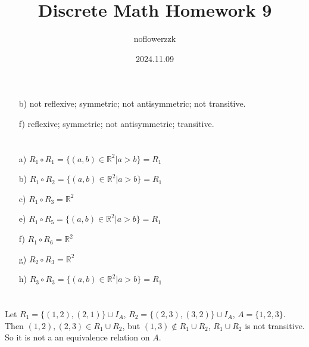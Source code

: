 \documentclass{article}
\title{Discrete Math Homework 9}
\author{noflowerzzk}
\date{2024.11.09}
\begin{document}
\maketitle

\section{}

\begin{itemize}
    \item [b)] not reflexive; symmetric; not antisymmetric; not transitive.
    \item [f)] reflexive; symmetric; not antisymmetric; transitive.
\end{itemize}

\section{}

\begin{itemize}
    \item [a)] $R_1 \circ R_1 = \{(a, b) \in \mathbb{R}^2| a > b\} = R_1$
    \item [b)] $R_1 \circ R_2 = \{(a, b) \in \mathbb{R}^2| a > b\} = R_1$
    \item [c)] $R_1 \circ R_3 = \mathbb{R}^2$
    \item [e)] $R_1 \circ R_5 = \{(a, b) \in \mathbb{R}^2| a > b\} = R_1$
    \item [f)] $R_1 \circ R_6 = \mathbb{R}^2$
    \item [g)] $R_2 \circ R_3 = \mathbb{R}^2$
    \item [h)] $R_3 \circ R_3 = \{(a, b) \in \mathbb{R}^2| a > b\} = R_1$
\end{itemize}

\section{}

Let $R_1 = \{(1, 2), (2, 1)\} \cup I_A$, $R_2 = \{(2, 3), (3, 2)\} \cup I_A$, $A = \{1, 2, 3\}$. \\
Then $(1, 2), (2, 3) \in R_1 \cup R_2$, but $(1, 3) \notin R_1 \cup R_2$, $R_1 \cup R_2$ is not transitive. \\
So it is not a an equivalence relation on $A$.

\section{}
\end{document}

